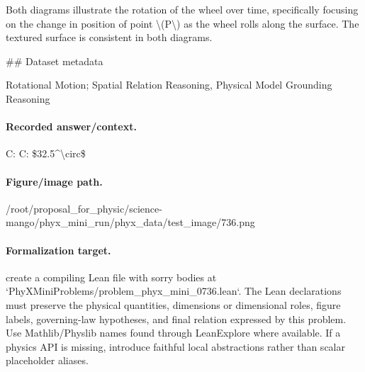 Both diagrams illustrate the rotation of the wheel over time, specifically focusing on the change in position of point \textbackslash{}(P\textbackslash{}) as the wheel rolls along the surface. The textured surface is consistent in both diagrams.

\#\# Dataset metadata

Rotational Motion; Spatial Relation Reasoning, Physical Model Grounding Reasoning

\paragraph{Recorded answer/context.}
C: C: \$32.5\textasciicircum{}\textbackslash{}circ\$

\paragraph{Figure/image path.}
/root/proposal\_for\_physic/science-mango/phyx\_mini\_run/phyx\_data/test\_image/736.png

\paragraph{Formalization target.}
create a compiling Lean file with sorry bodies at `PhyXMiniProblems/problem\_phyx\_mini\_0736.lean`. The Lean declarations must preserve the physical quantities, dimensions or dimensional roles, figure labels, governing-law hypotheses, and final relation expressed by this problem.
Use Mathlib/Physlib names found through LeanExplore where available. If a physics API is missing, introduce faithful local abstractions rather than scalar placeholder aliases.

